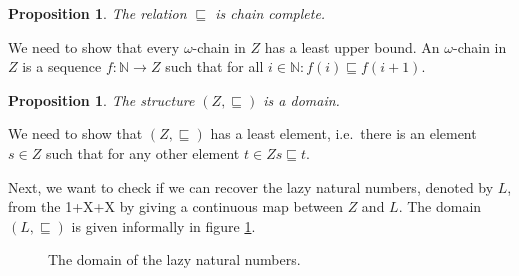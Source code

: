 \documentclass[a4paper]{article}
\newcommand{\arr}{\rightarrow}
\newtheorem{thmPONuFisChainComplete}[defNuF]{Proposition}
\newtheorem{thmPONuFisADomain}[defNuF]{Proposition}
\begin{document}
\begin{thmPONuFisChainComplete}

The relation $\sqsubseteq$ is chain complete.

\end{thmPONuFisChainComplete}

We need to show that every $\omega$-chain in $Z$ has a least upper bound.
An $\omega$-chain in $Z$ is a sequence $f : \mathbb{N} \arr Z$ such
that for all $i \in \mathbb{N}: f(i) \sqsubseteq f(i + 1)$.


\begin{thmPONuFisADomain}

The structure $(Z, \sqsubseteq)$ is a domain.

\end{thmPONuFisADomain}

We need to show that $(Z, \sqsubseteq)$ has a least element, i.e.~there is
an element $s \in Z$ such that for any other element $t \in Z s
\sqsubseteq t$.

Next, we want to check if we can recover the lazy natural numbers, denoted by
$L$, from the 1+X+X by giving a continuous map between $Z$ and $L$.
The domain $(L, \sqsubseteq)$ is given informally in figure
\ref{fig:DomainOfLazyNaturals}.


\begin{figure}
\begin{center}
\end{center}
\caption{The domain of the lazy natural numbers.}
\label{fig:DomainOfLazyNaturals}
\end{figure}
\end{document}
